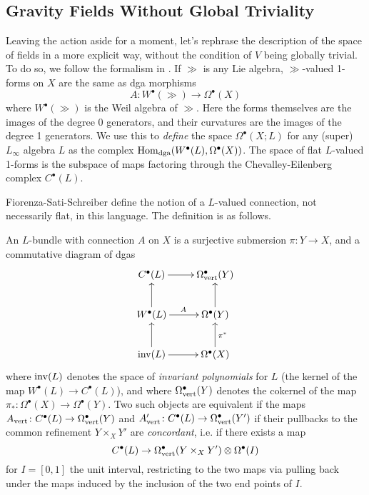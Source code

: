 \documentclass[10pt, oneside]{article}
\begin{document}
\subsection{Gravity Fields Without Global Triviality}
Leaving the action aside for a moment, let's rephrase the description of the space of fields in a more explicit way, without the condition of $V$ being globally trivial.  To do so, we follow the formalism in \cite{SSS}.  If $\gg$ is any Lie algebra, $\gg$-valued 1-forms on $X$ are the same as dga morphisms
\[A \colon W^\bullet(\gg) \to \Omega^\bullet(X)\]
where $W^\bullet(\gg)$ is the Weil algebra of $\gg$.  Here the forms themselves are the images of the degree 0 generators, and their curvatures are the images of the degree 1 generators.  We use this to \emph{define} the space $\Omega^\bullet(X; L)$ for any (super) $L_\infty$ algebra $L$ as the complex $\operatorname{Hom}_{\mathrm{dga}}(W^\bullet(L), \Omega^\bullet(X))$.  The space of flat $L$-valued 1-forms is the subspace of maps factoring through the Chevalley-Eilenberg complex $C^\bullet(L)$.

Fiorenza-Sati-Schreiber define the notion of a $L$-valued connection, not necessarily flat, in this language.  The definition is as follows.
\begin{definition} \label{connectiondef}
An $L$-bundle with connection $A$ on $X$ is a surjective submersion $\pi \colon Y \to X$, and a commutative diagram of dgas
\[\xymatrix{
C^\bullet(L) \ar[r] &\Omega^\bullet_{\mr{vert}}(Y) \\
W^\bullet(L) \ar[u] \ar[r]^A &\Omega^\bullet(Y) \ar[u] \\
\mr{inv}(L) \ar[u] \ar[r] & \Omega^\bullet(X) \ar[u]_{\pi^*}
}\]
where $\mathrm{inv}(L)$ denotes the space of \emph{invariant polynomials} for $L$ (the kernel of the map $W^\bullet(L) \to C^\bullet(L)$), and where $\Omega^\bullet_{\mathrm{vert}}(Y)$ denotes the cokernel of the map $\pi_* \colon \Omega^\bullet(X) \to \Omega^\bullet(Y)$.  Two such objects are equivalent if the maps $A_{\mathrm{vert}} \colon C^\bullet(L) \to \Omega^\bullet_{\mathrm{vert}}(Y)$ and  $A'_{\mathrm{vert}} \colon C^\bullet(L) \to \Omega^\bullet_{\mathrm{vert}}(Y')$ if their pullbacks to the common refinement $Y \times_X Y'$ are \emph{concordant}, i.e. if there exists a map
\[C^\bullet(L)  \to \Omega^\bullet_{\mathrm{vert}}(Y \times_X Y') \otimes \Omega^\bullet(I)\]
for $I = [0,1]$ the unit interval, restricting to the two maps via pulling back under the maps induced by the inclusion of the two end points of $I$.
\end{definition}
\end{document}
